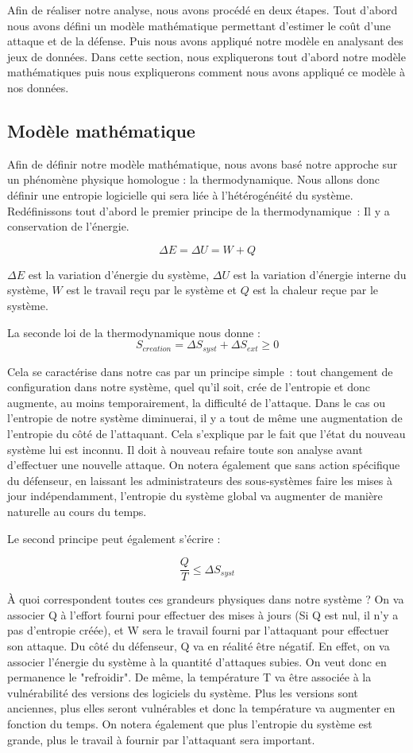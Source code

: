 Afin de réaliser notre analyse, nous avons procédé en deux étapes.
Tout d'abord nous avons défini un modèle mathématique permettant d'estimer le coût d'une attaque et de la défense.
Puis nous avons appliqué notre modèle en analysant des jeux de données.
Dans cette section, nous expliquerons tout d'abord notre modèle mathématiques puis nous expliquerons comment nous avons appliqué ce modèle à nos données.

\subsection{Modèle mathématique}\label{sec:modelMath}

Afin de définir notre modèle mathématique, nous avons basé notre approche sur un phénomène physique homologue : la thermodynamique.
Nous allons donc définir une entropie logicielle qui sera liée à l'hétérogénéité du système.
Redéfinissons tout d'abord le premier principe de la thermodynamique~: Il y a conservation de l'énergie. 

\[
\Delta E = \Delta U = W + Q
\]

$\Delta E$ est la variation d'énergie du système, $\Delta U$ est la variation d'énergie interne du système, $W$ est le travail reçu par le système et $Q$ est la chaleur reçue par le système.

La seconde loi de la thermodynamique nous donne :
\[
S_{creation} = \Delta S_{syst} + \Delta S_{ext} \geq 0
\]

Cela se caractérise dans notre cas par un principe simple~: tout changement de configuration dans notre système, quel qu'il soit, crée de l'entropie et donc augmente, au moins temporairement, la difficulté de l'attaque.
Dans le cas ou l'entropie de notre système diminuerai, il y a tout de même une augmentation de l'entropie du côté de l'attaquant. Cela s'explique par le fait que l'état du nouveau système lui est inconnu. Il doit à nouveau refaire toute son analyse avant d'effectuer une nouvelle attaque. On notera également que sans action spécifique du défenseur, en laissant les administrateurs des sous-systèmes faire les mises à jour indépendamment, l'entropie du système global va augmenter de manière naturelle au cours du temps. 

Le second principe peut également s'écrire :

\[
\frac{Q}{T} \leq \Delta S_{syst}
\]

À quoi correspondent toutes ces grandeurs physiques dans notre système ? On va associer Q à l'effort fourni pour effectuer des mises à jours (Si Q est nul, il n'y a pas d'entropie créée), et W sera le travail fourni par l'attaquant pour effectuer son attaque. Du côté du défenseur, Q va en réalité être négatif. En effet, on va associer l'énergie du système à la quantité d'attaques subies. On veut donc en permanence le "refroidir".
De même, la température T va être associée à la vulnérabilité des versions des logiciels du système. Plus les versions sont anciennes, plus elles seront vulnérables et donc la température va augmenter en fonction du temps.
On notera également que plus l'entropie du système est grande, plus le travail à fournir par l'attaquant sera important.



